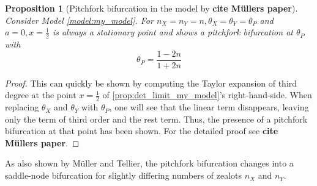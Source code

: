 \documentclass[12pt,a4paper,twoside]{article}
\newtheorem{prop}{Proposition}[section]
\begin{document}
\begin{prop}[Pitchfork bifurcation in the model by \textbf{cite M\"ullers paper}]\label{prop:mueller_stat_point}%
	Consider Model \ref{model:my_model}. For $n_X = n_Y = n, \theta_X = \theta_Y = \theta_P$ and $a = 0, x = \frac{1}{2}$ is always a stationary point and shows a pitchfork bifurcation at $\theta_P$ with
	\begin{equation*}
		\theta_P = \frac{1-2n}{1+2n}
	\end{equation*}
\end{prop}
\begin{proof}
	This can quickly be shown by computing the Taylor expansion of third degree at the point $x = \frac{1}{2}$ of \eqref{prop:det_limit_my_model}'s right-hand-side. When replacing $\theta_X$ and $\theta_Y$ with $\theta_P$, one will see that the linear term disappears, leaving only the term of third order and the rest term. Thus, the presence of a pitchfork bifurcation at that point has been shown. For the detailed proof see \textbf{cite M\"ullers paper}.
\end{proof}

As also shown by M\"uller and Tellier, the pitchfork bifurcation changes into a saddle-node bifurcation for slightly differing numbers of zealots $n_X$ and $n_Y$. %
\end{document}
